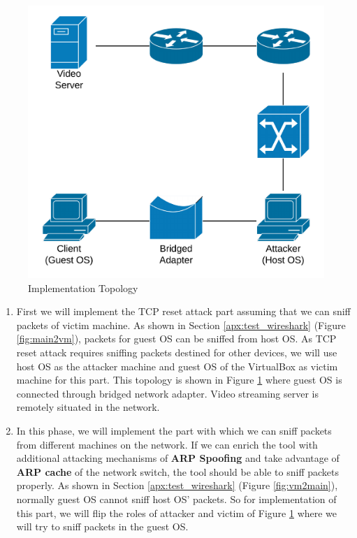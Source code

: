 \documentclass[14pt]{extarticle}
\begin{document}
    \begin{figure}
        \centering
        \includegraphics[width=.75\textwidth]{Pictures/TCP_RST_Topology_Implementation.png}
        \caption{Implementation Topology}
        \label{fig:topolgy_implement}
    \end{figure}
    
    
    \begin{enumerate}
      
      \item First we will implement the TCP reset attack part assuming that we can sniff packets of victim machine. As shown in Section \ref{apx:test_wireshark} (Figure \ref{fig:main2vm}), packets for guest OS can be sniffed from host OS. As TCP reset attack requires sniffing packets destined for other devices, we will use host OS as the attacker machine and guest OS of the VirtualBox as victim machine for this part. This topology is shown in Figure \ref{fig:topolgy_implement} where guest OS is connected through bridged network adapter. Video streaming server is remotely situated in the network.
      
      \item In this phase, we will implement the part with which we can sniff packets from different machines on the network. If we can enrich the tool with additional attacking mechanisms of \textbf{ARP Spoofing} and take advantage of \textbf{ARP cache} of the network switch, the tool should be able to sniff packets properly. As shown in Section \ref{apx:test_wireshark} (Figure \ref{fig:vm2main}), normally guest OS cannot sniff host OS' packets. So for implementation of this part, we will flip the roles of attacker and victim of Figure \ref{fig:topolgy_implement} where we will try to sniff packets in the guest OS. 
      
      \end{enumerate}
    
\end{document}
